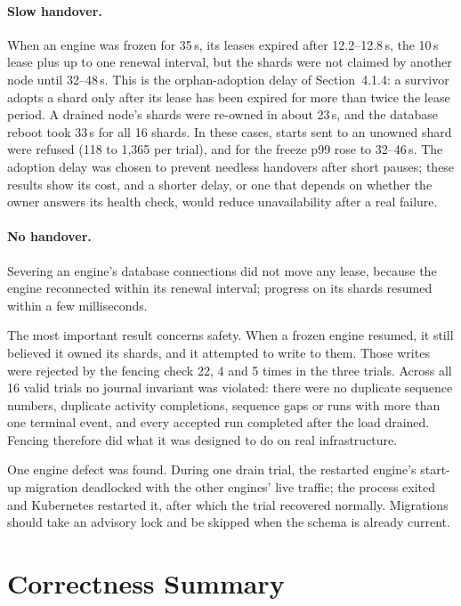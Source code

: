 \paragraph{Slow handover.} When an engine was frozen for 35\,s, its leases
expired after 12.2--12.8\,s, the 10\,s lease plus up to one renewal interval,
but the shards were not claimed by another node until 32--48\,s. This is the
orphan-adoption delay of Section~4.1.4: a survivor adopts a shard only after
its lease has been expired for more than twice the lease period. A drained
node's shards were re-owned in about 23\,s, and the database reboot took
33\,s for all 16 shards. In these cases, starts sent to an unowned shard were
refused (118 to 1,365 per trial), and for the freeze p99 rose to 32--46\,s.
The adoption delay was chosen to prevent needless handovers after short
pauses; these results show its cost, and a shorter delay, or one that
depends on whether the owner answers its health check, would reduce
unavailability after a real failure.

\paragraph{No handover.} Severing an engine's database connections did not
move any lease, because the engine reconnected within its renewal interval;
progress on its shards resumed within a few milliseconds.

The most important result concerns safety. When a frozen engine resumed, it
still believed it owned its shards, and it attempted to write to them. Those
writes were rejected by the fencing check 22, 4 and 5 times in the three
trials. Across all 16 valid trials no journal invariant was violated: there
were no duplicate sequence numbers, duplicate activity completions, sequence
gaps or runs with more than one terminal event, and every accepted run
completed after the load drained. Fencing therefore did what it was designed
to do on real infrastructure.

One engine defect was found. During one drain trial, the restarted engine's
start-up migration deadlocked with the other engines' live traffic; the
process exited and Kubernetes restarted it, after which the trial recovered
normally. Migrations should take an advisory lock and be skipped when the
schema is already current.

\section{Correctness Summary}

